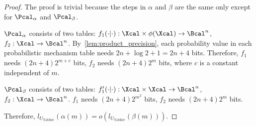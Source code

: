 \propInvShorter*
\begin{proof}
    The proof is trivial because the steps in $\alpha$ and $\beta$ are the same only except for $\Pcal_\alpha$ and $\Pcal_\beta$. 
    
    $\Pcal_\alpha$ consists of two tables: $f_1(\cdot| \cdot): \Xcal \times \phi(\Xcal) \to \Bcal^n$, $f_{2}:\Xcal\to \Bcal^n$. By~\cref{lem:product_precision}, each probability value in each probabilistic mechanism table needs $2n+\log 2 + 1 = 2n+4$ bits. Therefore, $f_1$ needs $(2n+4)2^{m+c}$ bits, $f_2$ needs $(2n+4)2^{m}$ bits, where $c$ is a constant independent of $m$.

    $\Pcal_\beta$ consists of two tables: $f'_1(\cdot| \cdot): \Xcal \times \Xcal \to \Bcal^n$, $f_{2}:\Xcal\to \Bcal^n$. $f_1$ needs $(2n+4)2^{m^2}$ bits, $f_2$ needs $(2n+4)2^{m}$ bits.

    Therefore, $l_{U_{\text{TabInv}}} (\alpha(m)) = o(l_{U_{\text{TabInv}}} (\beta(m)))$.


    




    
\end{proof}

%

%